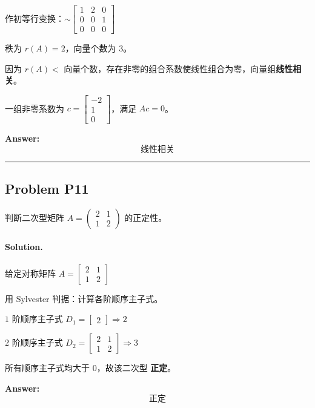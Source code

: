 \documentclass[12pt, a4paper]{article}
\newcommand{\problem}[1]{\subsection*{Problem #1}}
\newcommand{\solution}{\paragraph{Solution.}}
\begin{document}
作初等行变换：$\sim \left[\begin{matrix}1 & 2 & 0\\0 & 0 & 1\\0 & 0 & 0\end{matrix}\right]$

秩为 $r(A) = 2$，向量个数为 $3$。

因为 $r(A) <$ 向量个数，存在非零的组合系数使线性组合为零，向量组\textbf{线性相关}。

一组非零系数为 $c = \left[\begin{matrix}-2\\1\\0\end{matrix}\right]$，满足 $Ac = 0$。

\textbf{Answer:}
\[\text{线性相关}\]


\vspace{1em}
\hrule
\vspace{1em}

\problem{P11}

判断二次型矩阵 $A = \begin{pmatrix} 2 & 1 \\ 1 & 2 \end{pmatrix}$ 的正定性。

\solution


给定对称矩阵 $A = \left[\begin{matrix}2 & 1\\1 & 2\end{matrix}\right]$

用 Sylvester 判据：计算各阶顺序主子式。

$1$ 阶顺序主子式 $D_{1} = \left[\begin{matrix}2\end{matrix}\right] \Rightarrow 2$

$2$ 阶顺序主子式 $D_{2} = \left[\begin{matrix}2 & 1\\1 & 2\end{matrix}\right] \Rightarrow 3$

所有顺序主子式均大于 $0$，故该二次型 \textbf{正定}。

\textbf{Answer:}
\[\text{正定}\]

\end{document}

